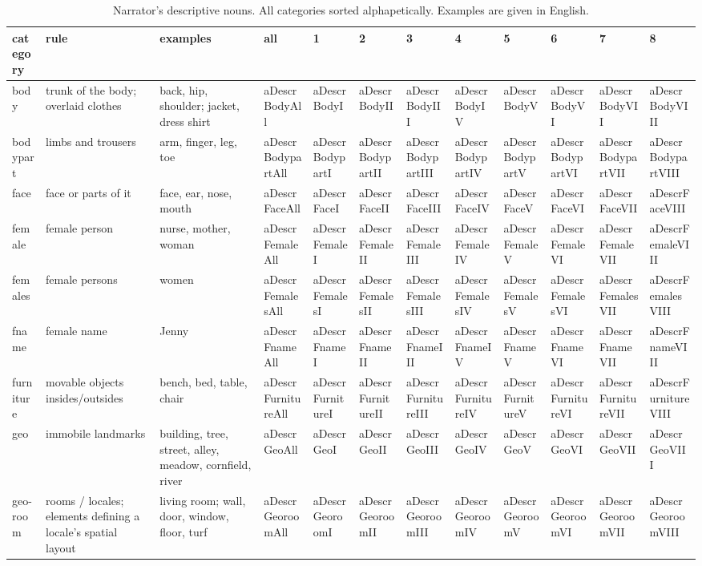 \documentclass[english]{article}
\begin{document}
\begin{table}[t]
    \caption{Narrator's descriptive nouns. All categories sorted alphapetically. Examples are given in English.}
\label{tab:descr-nouns}
\begin{tabular}{llllllllllll}
\toprule
\textbf{category} & \textbf{rule} & \textbf{examples} & \textbf{all} & \textbf{1} & \textbf{2} & \textbf{3} & \textbf{4} & \textbf{5} & \textbf{6} & \textbf{7} & \textbf{8} \\
\midrule
body & trunk of the body; overlaid clothes & back, hip, shoulder; jacket, dress shirt & aDescrBodyAll & aDescrBodyI & aDescrBodyII & aDescrBodyIII & aDescrBodyIV & aDescrBodyV & aDescrBodyVI & aDescrBodyVII & aDescrBodyVIII \tabularnewline
bodypart & limbs and trousers & arm, finger, leg, toe & aDescrBodypartAll & aDescrBodypartI & aDescrBodypartII & aDescrBodypartIII & aDescrBodypartIV & aDescrBodypartV & aDescrBodypartVI & aDescrBodypartVII & aDescrBodypartVIII\tabularnewline
face & face or parts of it & face, ear, nose, mouth & aDescrFaceAll & aDescrFaceI & aDescrFaceII & aDescrFaceIII & aDescrFaceIV & aDescrFaceV & aDescrFaceVI & aDescrFaceVII & aDescrFaceVIII \tabularnewline
female & female person & nurse, mother, woman & aDescrFemaleAll & aDescrFemaleI & aDescrFemaleII & aDescrFemaleIII & aDescrFemaleIV & aDescrFemaleV & aDescrFemaleVI & aDescrFemaleVII & aDescrFemaleVIII \tabularnewline
females & female persons & women & aDescrFemalesAll & aDescrFemalesI & aDescrFemalesII & aDescrFemalesIII & aDescrFemalesIV & aDescrFemalesV & aDescrFemalesVI & aDescrFemalesVII & aDescrFemalesVIII \tabularnewline
fname & female name & Jenny & aDescrFnameAll & aDescrFnameI & aDescrFnameII & aDescrFnameIII & aDescrFnameIV & aDescrFnameV & aDescrFnameVI & aDescrFnameVII & aDescrFnameVIII \tabularnewline
furniture & movable objects insides/outsides & bench, bed, table, chair & aDescrFurnitureAll & aDescrFurnitureI & aDescrFurnitureII & aDescrFurnitureIII & aDescrFurnitureIV & aDescrFurnitureV & aDescrFurnitureVI & aDescrFurnitureVII & aDescrFurnitureVIII \tabularnewline
geo & immobile landmarks & building, tree, street, alley, meadow, cornfield, river & aDescrGeoAll & aDescrGeoI & aDescrGeoII & aDescrGeoIII & aDescrGeoIV & aDescrGeoV & aDescrGeoVI & aDescrGeoVII & aDescrGeoVIII \tabularnewline
geo-room & rooms / locales; elements defining a locale's spatial layout & living room; wall, door, window, floor, turf & aDescrGeoroomAll & aDescrGeoroomI & aDescrGeoroomII & aDescrGeoroomIII & aDescrGeoroomIV & aDescrGeoroomV & aDescrGeoroomVI & aDescrGeoroomVII & aDescrGeoroomVIII \tabularnewline

\end{tabular}
\end{table}
\end{document}

